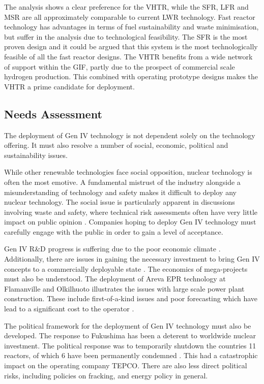 \documentclass[journal]{IEEEtran}
\begin{document}
The analysis shows a clear preference for the VHTR, while the SFR, LFR and MSR are all approximately comparable to current LWR technology.
Fast reactor technology has advantages in terms of fuel sustainability and waste minimisation, but suffer in the analysis due to technological feasibility.
The SFR is the most proven design and it could be argued that this system is the most technologically feasible of all the fast reactor designs.
The VHTR benefits from a wide network of support within the GIF, partly due to the prospect of commercial scale hydrogen production.
This combined with operating prototype designs makes the VHTR a prime candidate for deployment.

\subsection{Needs Assessment}
The deployment of Gen IV technology is not dependent solely on the technology offering.
It must also resolve a number of social, economic, political and sustainability issues.

While other renewable technologies face social opposition, nuclear technology is often the most emotive.
A fundamental mistrust of the industry alongside a misunderstanding of technology and safety makes it difficult to deploy any nuclear technology.
The social issue is particularly apparent in discussions involving waste and safety, where technical risk assessments often have very little impact on public opinion \cite{Marques2010a}.
Companies hoping to deploy Gen IV technology must carefully engage with the public in order to gain a level of acceptance.

Gen IV R\&D progress is suffering due to the poor economic climate \cite{nnl}.
Additionally, there are issues in gaining the necessary investment to bring Gen IV concepts to a commercially deployable state \cite{Bhatnagar2011}.
The economics of mega-projects must also be understood.
The deployment of Areva EPR technology at Flamanville and Olkilhuoto illustrates the issues with large scale power plant construction. 
These include first-of-a-kind issues and poor forecasting which have lead to a significant cost to the operator \cite{Locatelli2013}.

The political framework for the deployment of Gen IV technology must also be developed.
The response to Fukushima has been a deterent to worldwide nuclear investment.
The political response was to temporarily shutdown the countries 11 reactors, of which 6 have been permanently condemned \cite{schneider2012nuclear}.
This had a catastrophic impact on the operating company TEPCO.
There are also less direct political risks, including policies on fracking, and energy policy in general.
\end{document}
